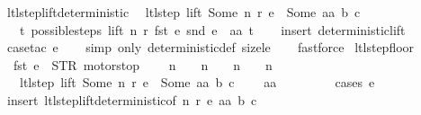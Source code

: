 \begin{isabellebody}
\ ltl{\isacharunderscore}step{\isacharunderscore}lift{\isacharunderscore}deterministic{\isacharcolon}\isanewline
\ \ {\isachardoublequoteopen}ltl{\isacharunderscore}step\ lift\ {\isacharparenleft}Some\ n{\isacharparenright}\ r\ e\ {\isacharequal}\ {\isacharparenleft}Some\ aa{\isacharcomma}\ b{\isacharcomma}\ c{\isacharparenright}\ {\isasymLongrightarrow}\isanewline
\ \ \ {\isasymexists}t{\isachardot}\ possible{\isacharunderscore}steps\ lift\ n\ r\ {\isacharparenleft}fst\ e{\isacharparenright}\ {\isacharparenleft}snd\ e{\isacharparenright}\ {\isacharequal}\ {\isacharbraceleft}{\isacharbar}{\isacharparenleft}aa{\isacharcomma}\ t{\isacharparenright}{\isacharbar}{\isacharbraceright}{\isachardoublequoteclose}\isanewline
%
\isadelimproof
\ \ %
\endisadelimproof
%
\isatagproof
{}\isamarkupfalse%
\ {\isacharparenleft}insert\ deterministic{\isacharunderscore}lift{\isacharparenright}\isanewline
\ \ \isamarkupfalse%
\ {\isacharparenleft}case{\isacharunderscore}tac\ e{\isacharparenright}\isanewline
\ \ \isamarkupfalse%
\ {\isacharparenleft}simp\ only{\isacharcolon}\ deterministic{\isacharunderscore}def\ size{\isacharunderscore}le{\isacharunderscore}{}{\isacharparenright}\isanewline
\ \ \isamarkupfalse%
\ fastforce%
\endisatagproof
{\isafoldproof}%
%
\isadelimproof
\isanewline
%
\endisadelimproof
\isanewline
{}\isamarkupfalse%
\ ltl{\isacharunderscore}step{\isacharunderscore}floor{\isacharcolon}\isanewline
\ \ {\isachardoublequoteopen}fst\ e\ {\isasymnoteq}\ STR\ {\isacharprime}{\isacharprime}motorstop{\isacharprime}{\isacharprime}\ {\isasymLongrightarrow}\isanewline
\ \ \ n\ {\isacharequal}\ {}\ {\isasymor}\ n\ {\isacharequal}\ {}\ {\isasymor}\ n\ {\isacharequal}\ {}\ {\isasymor}\ n\ {\isacharequal}\ {}\ {\isasymLongrightarrow}\isanewline
\ \ \ ltl{\isacharunderscore}step\ lift\ {\isacharparenleft}Some\ n{\isacharparenright}\ r\ e\ {\isacharequal}\ {\isacharparenleft}Some\ aa{\isacharcomma}\ b{\isacharcomma}\ c{\isacharparenright}\ {\isasymLongrightarrow}\isanewline
\ \ \ aa\ {\isasymin}\ {\isacharbraceleft}{}{\isacharcomma}\ {}{\isacharcomma}\ {}{\isacharcomma}\ {}{\isacharbraceright}{\isachardoublequoteclose}\isanewline
%
\isadelimproof
\ \ %
\endisadelimproof
%
\isatagproof
{}\isamarkupfalse%
\ {\isacharparenleft}cases\ e{\isacharparenright}\isanewline
\ \ \isamarkupfalse%
\ {\isacharparenleft}insert\ ltl{\isacharunderscore}step{\isacharunderscore}lift{\isacharunderscore}deterministic{\isacharbrackleft}of\ n\ r\ e\ aa\ b\ c{\isacharbrackright}{\isacharparenright}\isanewline

\end{isabellebody}
